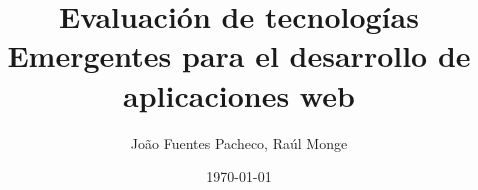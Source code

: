 \documentclass[letter, 11pt]{article}
\begin{document}
\title{Evaluación de tecnologías Emergentes para el desarrollo de aplicaciones web }
\author{Jo\~ao Fuentes Pacheco, Raúl Monge}
\date{\today}
\maketitle

\newpage
\newpage



























%
\end{document}
